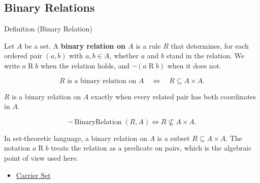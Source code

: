 \subsection*{Binary Relations}
\label{subsec:binary-relations}

\begin{definitionbox}{Definition (Binary Relation)}
\begin{definition}
\label{def:binary-relation}
Let $A$ be a set.
A \textbf{binary relation on $A$} is a rule $R$ that determines, for each
ordered pair $(a,b)$ with $a,b \in A$, whether $a$ and $b$ stand in the
relation.  We write $a \mathrel{R} b$ when the relation holds, and
$\lnot(a \mathrel{R} b)$ when it does not.
\end{definition}
\end{definitionbox}

\begin{remark*}
\[
R \text{ is a binary relation on } A
\quad\Longleftrightarrow\quad
R\subseteq A\times A.
\]
\end{remark*}

\begin{remark*}
$R$ is a binary relation on $A$ exactly when every related pair has both
coordinates in $A$.
\end{remark*}

\begin{remark*}
\[
\neg\operatorname{BinaryRelation}(R,A)
\Longleftrightarrow
R\not\subseteq A\times A.
\]
\end{remark*}

\begin{remark*}[Interpretation]
In set-theoretic language, a binary relation on $A$ is a subset
$R \subseteq A \times A$.  The notation $a \mathrel{R} b$ treats the relation
as a predicate on pairs, which is the algebraic point of view used here.
\end{remark*}

\begin{dependencies}
\begin{itemize}
  \item \hyperref[def:carrier-set]{Carrier Set}
\end{itemize}
\end{dependencies}
